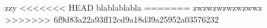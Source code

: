 zzy
<<<<<<< HEAD
blablablabla
=======
zwzwzwzwzwzwwz
>>>>>>> 6f9d83a22a93ff12cd9a18d39a25952a03576232
